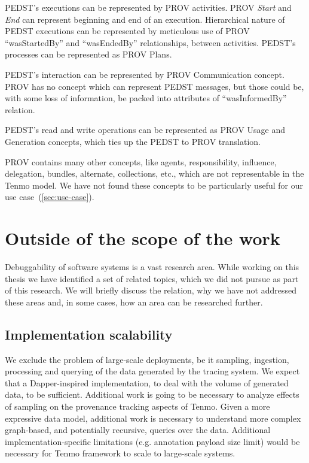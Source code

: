 PEDST’s executions can be represented by PROV activities. PROV \textit{Start} and \textit{End} can represent beginning and end of an execution. Hierarchical nature of PEDST executions can be represented by meticulous use of PROV ``wasStartedBy''  and ``wasEndedBy''  relationships, between activities. PEDST’s processes can be represented as PROV Plans.

PEDST’s interaction can be represented by PROV Communication concept. PROV has no concept which can represent PEDST messages, but those could be, with some loss of information, be packed into attributes of ``wasInformedBy'' relation.

PEDST’s read and write operations can be represented as PROV Usage and Generation concepts, which ties up the PEDST to PROV translation.

PROV contains many other concepts, like agents, responsibility, influence, delegation, bundles, alternate, collections, etc., which are not representable in the Tenmo model. We have not found these concepts to be particularly useful for our use case~(\cref{sec:use-case}).





\begin{comment}
BRAK CZASU

\todo{IMAGE: Translation of an example from Tenmo to PROV}
\todo{TABLE: Maybe add translation table}
\end{comment}


\section{Outside of the scope of the work}

Debuggability of software systems is a vast research area. While working on this thesis we have identified a set of related topics, which we did not pursue as part of this research. We will briefly discuss the relation, why we have not addressed these areas and, in some cases, how an area can be researched further.

\subsection{Implementation scalability}

We exclude the problem of large-scale deployments, be it sampling, ingestion, processing and querying of the data generated by the tracing system. We expect that a Dapper-inspired implementation, to deal with the volume of generated data, to be sufficient. Additional work is going to be necessary to analyze effects of sampling on the provenance tracking aspects of Tenmo. Given a more expressive data model, additional work is necessary to understand  more complex graph-based, and potentially recursive, queries over the data. Additional implementation-specific limitations (e.g. annotation payload size limit) would be necessary for Tenmo framework to scale to large-scale systems.

